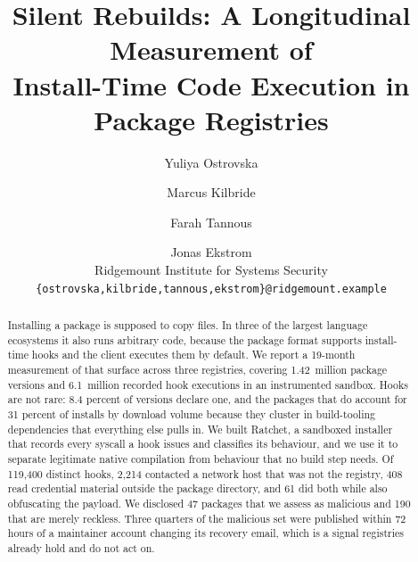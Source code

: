 \documentclass[10pt,twocolumn]{article}
\title{\vspace{-8mm}\bfseries\large
Silent Rebuilds: A Longitudinal Measurement of\\
Install-Time Code Execution in Package Registries}
\author{
  \normalsize Yuliya Ostrovska \and Marcus Kilbride \and Farah Tannous \and Jonas Ekstrom\\[1mm]
  \footnotesize Ridgemount Institute for Systems Security\\
  \footnotesize \texttt{\{ostrovska,kilbride,tannous,ekstrom\}@ridgemount.example}
}
\date{}
\newcommand{\tool}{Ratchet}
\begin{document}
\maketitle

\begin{abstract}
\noindent
Installing a package is supposed to copy files. In three of the largest
language ecosystems it also runs arbitrary code, because the package format
supports install-time hooks and the client executes them by default. We report
a 19-month measurement of that surface across three registries, covering
1.42~million package versions and 6.1~million recorded hook executions in an
instrumented sandbox. Hooks are not rare: 8.4 percent of versions declare one,
and the packages that do account for 31 percent of installs by download volume
because they cluster in build-tooling dependencies that everything else pulls
in. We built \tool, a sandboxed installer that records every syscall a hook
issues and classifies its behaviour, and we use it to separate legitimate
native compilation from behaviour that no build step needs. Of 119{,}400
distinct hooks, 2{,}214 contacted a network host that was not the registry,
408 read credential material outside the package directory, and 61 did both
while also obfuscating the payload. We disclosed 47 packages that we assess as
malicious and 190 that are merely reckless. Three quarters of the malicious
set were published within 72 hours of a maintainer account changing its
recovery email, which is a signal registries already hold and do not act on.
\end{abstract}











\end{document}
